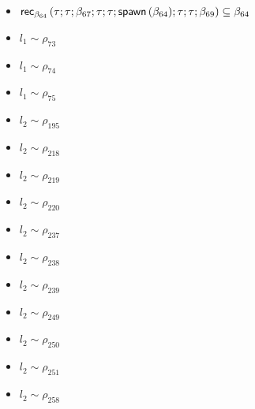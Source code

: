 \documentclass{article}
\begin{document}
\begin{itemize}
\item $ \orec{ (\tau; \tau; \beta_{67}; \tau; \tau; \espawn{ (\beta_{64})}; \tau; \tau; \beta_{69})}{\beta_{64}} \subseteq \beta_{64} $
\item $ l_{1} \sim\rho_{73} $
\item $ l_{1} \sim\rho_{74} $
\item $ l_{1} \sim\rho_{75} $
\item $ l_{2} \sim\rho_{195} $
\item $ l_{2} \sim\rho_{218} $
\item $ l_{2} \sim\rho_{219} $
\item $ l_{2} \sim\rho_{220} $
\item $ l_{2} \sim\rho_{237} $
\item $ l_{2} \sim\rho_{238} $
\item $ l_{2} \sim\rho_{239} $
\item $ l_{2} \sim\rho_{249} $
\item $ l_{2} \sim\rho_{250} $
\item $ l_{2} \sim\rho_{251} $
\item $ l_{2} \sim\rho_{258} $
\end{itemize}
\end{document}
